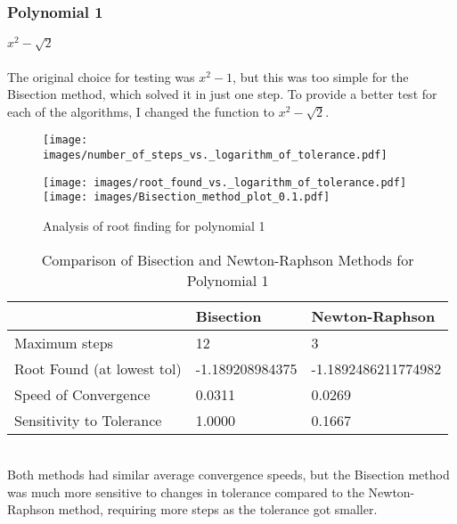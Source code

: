 \documentclass{llncs}
\numberwithin{figure}{section}
\begin{document}
\subsubsection{Polynomial 1} \(x^2 - \sqrt{2}\)
\\\\ The original choice for testing was \(x^2 - 1\), but this was too simple for the Bisection method, which solved it in just one step. To provide a better test for each of the algorithms, I changed the function to \(x^2 - \sqrt{2}\).
\begin{figure}[h!]
    \centering
    \begin{minipage}[c]{0.65\textwidth}
        \centering
        \texttt{[image: images/number\_of\_steps\_vs.\_logarithm\_of\_tolerance.pdf]}
    \end{minipage}%
    \begin{minipage}[c]{0.35\textwidth}
        \centering
        \texttt{[image: images/root\_found\_vs.\_logarithm\_of\_tolerance.pdf]}
        \hspace{6em} %
        \texttt{[image: images/Bisection\_method\_plot\_0.1.pdf]}
    \end{minipage}
    \caption{Analysis of root finding for polynomial 1}
    \label{fig:composite}
\end{figure}
\vspace{-2em}
\begin{table}[h!]
\centering
\caption{Comparison of Bisection and Newton-Raphson Methods for Polynomial 1}
\begin{tabularx}{\textwidth}{|X|X|X|}
\hline
 & Bisection & Newton-Raphson \\
\hline
Maximum steps & 12 & 3 \\
\hline
Root Found (at lowest tol) & -1.189208984375 & -1.1892486211774982 \\
\hline
Speed of Convergence & 0.0311 & 0.0269 \\
\hline
Sensitivity to Tolerance & 1.0000 & 0.1667 \\
\hline
\end{tabularx}
\end{table}
\\Both methods had similar average convergence speeds, but the Bisection method was much more sensitive to changes in tolerance compared to the Newton-Raphson method, requiring more steps as the tolerance got smaller.
\newpage
\end{document}
